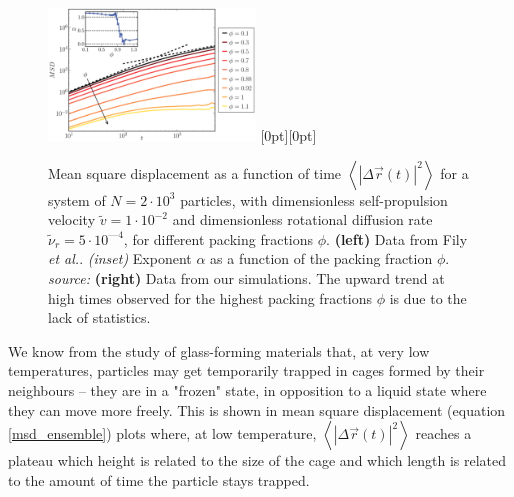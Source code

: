 \documentclass[class=report, float=false, crop=false]{standalone}
\begin{document}

\begin{figure}[h!]
\centering
\includegraphics[width=0.49\textwidth]{figures/images/msd_Vj1000_Rh5000_No2000.png}
\hfill
\raisebox{-2.5mm}[0pt][0pt]{}
\caption{Mean square displacement as a function of time $\left<|\Delta\vec{r}(t)|^2\right>$ for a system of $N=2\cdot10^3$ particles, with dimensionless self-propulsion velocity $\tilde{v} = 1\cdot10^{-2}$ and dimensionless rotational diffusion rate $\tilde{\nu}_r = 5\cdot10^{—4}$, for different packing fractions $\phi$. \textbf{(left)} Data from Fily \textit{et al.}. \textit{(inset)} Exponent $\alpha$ as a function of the packing fraction $\phi$. \textit{source:} \cite{fily2014freezing} \textbf{(right)} Data from our simulations. The upward trend at high times observed for the highest packing fractions $\phi$ is due to the lack of statistics.}
\label{msd_phi}
\end{figure}

We know from the study of glass-forming materials \cite{binder2011glassy} that, at very low temperatures, particles may get temporarily trapped in cages formed by their neighbours -- they are in a "frozen" state, in opposition to a liquid state where they can move more freely. This is shown in mean square displacement (equation \ref{msd_ensemble}) plots where, at low temperature, $\left<|\Delta\vec{r}(t)|^2\right>$ reaches a plateau which height is related to the size of the cage and which length is related to the amount of time the particle stays trapped.\\
\end{document}
